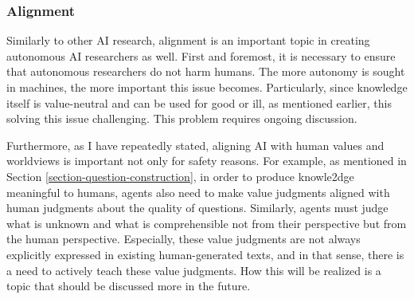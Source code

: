 


\subsubsection{Alignment}
Similarly to other AI research, alignment is an important topic in creating autonomous AI researchers as well. First and foremost, it is necessary to ensure that autonomous researchers do not harm humans. The more autonomy is sought in machines, the more important this issue becomes. Particularly, since knowledge itself is value-neutral and can be used for good or ill, as mentioned earlier, this solving this issue challenging. This problem requires ongoing discussion.

Furthermore, as I have repeatedly stated, aligning AI with human values and worldviews is important not only for safety reasons. For example, as mentioned in Section \ref{section-question-construction}, in order to produce knowle2dge meaningful to humans, agents also need to make value judgments aligned with human judgments about the quality of questions. Similarly, agents must judge what is unknown and what is comprehensible not from their perspective but from the human perspective. Especially, these value judgments are not always explicitly expressed in existing human-generated texts, and in that sense, there is a need to actively teach these value judgments. How this will be realized is a topic that should be discussed more in the future.

